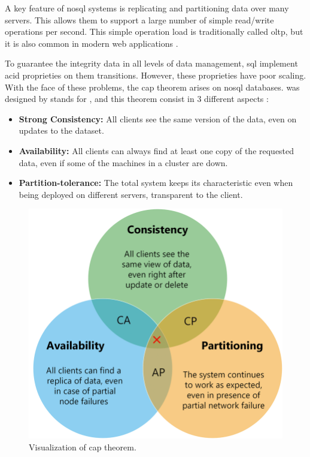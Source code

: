 A key feature of \gls{nosql} systems is replicating and partitioning data
over many servers. This allows them to support a large number of simple read/write operations per second. This simple operation load is traditionally called \gls{oltp}, but it is also common in modern web applications \cite{cattell2011scalable}.

To guarantee the integrity data in all levels of data management, \gls{sql} implement \gls{acid} proprieties on them transitions. However, these proprieties have poor scaling. With the face of these problems, the \gls{cap} theorem arises on \gls{nosql} databases.
 was designed by \citeauthor{brewer2000towards}\cite{brewer2000towards} stands for , and this theorem consist in 3 different aspects \cite{nosqlsyed,gilbert2012perspectives}: 
\begin{itemize} 
    \item \textbf{Strong Consistency:} All clients see the same version of the data, even on updates to the dataset.
    \item \textbf{Availability:} All clients can always find at least one copy of the requested data, even if some of the machines in a cluster are down.
    \item \textbf{Partition-tolerance:} The total system keeps its characteristic even when being deployed on different servers, transparent to the client.
\end{itemize}

    \begin{figure}[h!]
    \centering
    \includegraphics[width=0.65\columnwidth]{Chapters/images/Visualization-of-CAP-theorem.png}
        \caption{Visualization of \gls{cap} theorem.}
    \label{fig:capthoerm}
    \end{figure}

